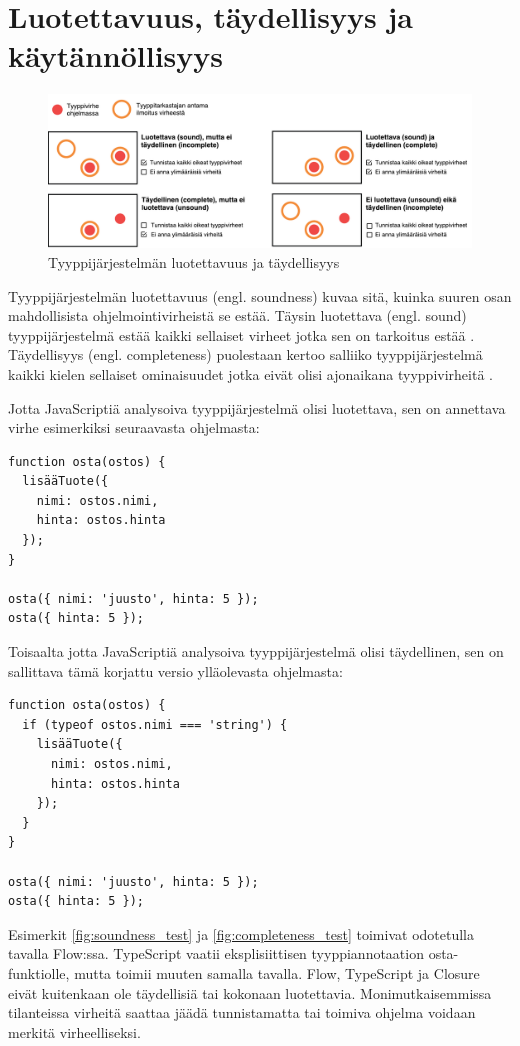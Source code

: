 \section{Luotettavuus, täydellisyys ja käytännöllisyys}
\begin{figure}[!htb]
\includegraphics[width=\textwidth]{images/soundness_completeness2.pdf}
\caption{Tyyppijärjestelmän luotettavuus ja täydellisyys}
\end{figure}

Tyyp\-pi\-jär\-jes\-tel\-män luotettavuus (engl. soundness) kuvaa sitä,
kuinka suuren osan\newline
mah\-dol\-li\-sis\-ta oh\-jel\-moin\-ti\-vir\-heis\-tä se
estää. Täysin luotettava (engl. sound) tyyppijärjestelmä estää kaikki
sellaiset virheet jotka sen on tarkoitus estää
\cite{CSE_ProgrammingLanguages}. Täydellisyys (engl. \mbox{completeness})
puolestaan kertoo salliiko tyyppijärjestelmä kaikki kielen sellaiset
ominaisuudet jotka eivät olisi ajonaikana tyyppivirheitä
\cite{TypesAndProgrammingLanguages, CSE_ProgrammingLanguages}.

Jotta JavaScriptiä analysoiva tyyppijärjestelmä olisi luotettava, sen on
annettava virhe esimerkiksi seuraavasta ohjelmasta:

\begin{lstlisting}[caption={Virheellinen JavaScript-ohjelma: lisätyllä tuotteella ei ole nimeä.},label={fig:soundness_test}]
function osta(ostos) {
  lisääTuote({
    nimi: ostos.nimi,
    hinta: ostos.hinta
  });
}

osta({ nimi: 'juusto', hinta: 5 });
osta({ hinta: 5 });
\end{lstlisting}
Toisaalta jotta JavaScriptiä analysoiva tyyppijärjestelmä olisi täydellinen,
sen on sallittava tämä korjattu versio ylläolevasta ohjelmasta:
\begin{lstlisting}[caption={Toimiva JavaScript-ohjelma: virheelliseltä kutsulta on suojauduttu tarkistuksella.},label={fig:completeness_test}]
function osta(ostos) {
  if (typeof ostos.nimi === 'string') {
    lisääTuote({
      nimi: ostos.nimi,
      hinta: ostos.hinta
    });
  }
}

osta({ nimi: 'juusto', hinta: 5 });
osta({ hinta: 5 });
\end{lstlisting}
Esimerkit \ref{fig:soundness_test} ja \ref{fig:completeness_test} toimivat
odotetulla tavalla Flow:ssa. TypeScript vaatii eksplisiittisen tyyppiannotaation
osta-funktiolle, mutta toimii muuten samalla tavalla. Flow, TypeScript ja
Closure eivät kuitenkaan ole täydellisiä tai kokonaan luotettavia.
Monimutkaisemmissa tilanteissa virheitä saattaa jäädä tunnistamatta tai toimiva
ohjelma voidaan merkitä virheelliseksi.

